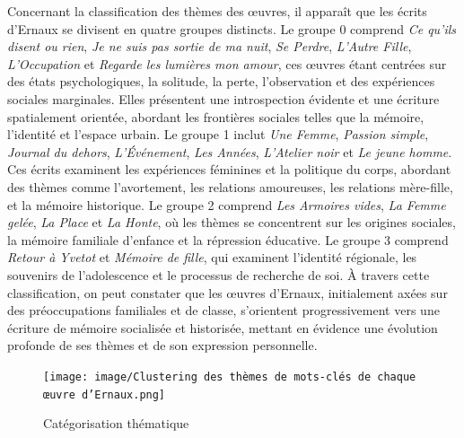 Concernant la classification des thèmes des œuvres, il apparaît que les écrits d'Ernaux se divisent en quatre groupes distincts. Le groupe 0 comprend \textit{Ce qu’ils disent ou rien}, \textit{Je ne suis pas sortie de ma nuit}, \textit{Se Perdre}, \textit{L’Autre Fille}, \textit{L’Occupation} et \textit{Regarde les lumières mon amour}, ces œuvres étant centrées sur des états psychologiques, la solitude, la perte, l’observation et des expériences sociales marginales. Elles présentent une introspection évidente et une écriture spatialement orientée, abordant les frontières sociales telles que la mémoire, l’identité et l’espace urbain. Le groupe 1 inclut \textit{Une Femme}, \textit{Passion simple}, \textit{Journal du dehors}, \textit{L’Événement}, \textit{Les Années}, \textit{L’Atelier noir} et \textit{Le jeune homme}. Ces écrits examinent les expériences féminines et la politique du corps, abordant des thèmes comme l'avortement, les relations amoureuses, les relations mère-fille, et la mémoire historique. Le groupe 2 comprend \textit{Les Armoires vides}, \textit{La Femme gelée}, \textit{La Place} et \textit{La Honte}, où les thèmes se concentrent sur les origines sociales, la mémoire familiale d'enfance et la répression éducative. Le groupe 3 comprend \textit{Retour à Yvetot} et \textit{Mémoire de fille}, qui examinent l'identité régionale, les souvenirs de l’adolescence et le processus de recherche de soi. À travers cette classification, on peut constater que les œuvres d'Ernaux, initialement axées sur des préoccupations familiales et de classe, s’orientent progressivement vers une écriture de mémoire socialisée et historisée, mettant en évidence une évolution profonde de ses thèmes et de son expression personnelle.\\
\begin{figure}[ht!]
    \centering
    \texttt{[image: image/Clustering des thèmes de mots-clés de chaque œuvre d'Ernaux.png]}
    \caption{Catégorisation thématique}
    \label{fig:Catégorisation thematique}
\end{figure}

 

